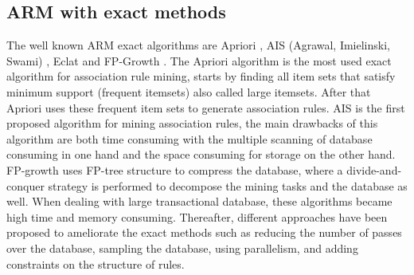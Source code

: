 \documentclass[preprint,12pt]{elsarticle}
\begin{document}
\subsection{ARM with exact methods} The well known ARM exact algorithms are Apriori \cite{5}, AIS (Agrawal, Imielinski, Swami) \cite{1}, 
Eclat \cite{9} and FP-Growth \cite{6}. 
The Apriori algorithm is the most used exact algorithm for association rule mining, starts by finding all item sets that satisfy minimum support 
(frequent itemsets) also called large itemsets. After that Apriori uses these frequent item sets to generate association rules. 
AIS is the first proposed algorithm for mining association rules, the main drawbacks of this algorithm are both time consuming with the multiple scanning 
of database consuming in one hand and the space consuming for storage on the other hand. FP-growth uses FP-tree structure to compress the database, where 
a divide-and-conquer strategy is performed to decompose the mining tasks and the database as well. When dealing with large transactional database, 
these algorithms became high time and memory consuming. Thereafter, different approaches have 
been proposed to ameliorate the exact methods such as reducing the number of passes over the database, sampling the database, using parallelism, and adding constraints on the structure of rules.
\end{document}
